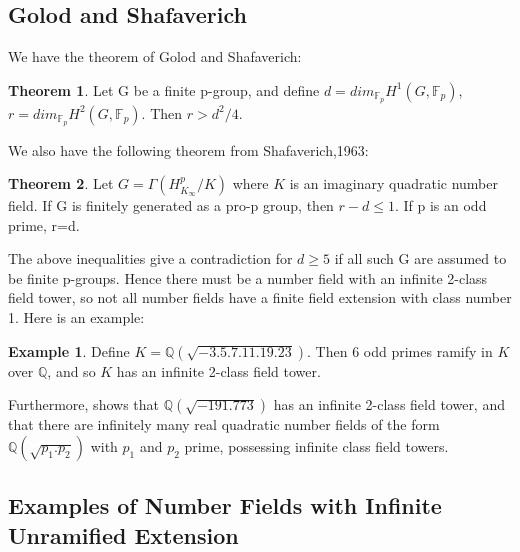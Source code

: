 \documentclass[12pt]{extarticle}
\newcommand{\<}{\langle}
\renewcommand{\>}{\rangle}
\theoremstyle{definition}
\newtheorem{theorem}{Theorem}
\newtheorem*{example}{Example}
\begin{document}
\subsection{Golod and Shafaverich}
We have the theorem of Golod and Shafaverich:\begin{theorem}
    Let G be a finite p-group, and define $d=dim_{\mathbb{F}_{p}}H^1(G,\mathbb{F}_p)$, $r=dim_{\mathbb{F}_{p}}H^2(G,\mathbb{F}_p)$. 
    Then $r>d^2/4$.
\end{theorem}
We also have the following theorem from Shafaverich,1963:\begin{theorem}
    Let $G = \Gamma(H_{K_{\infty}}^{p}/K)$ where $K$ is an imaginary quadratic number field. If G is finitely generated as a pro-p group, then
$r-d\leq 1 $. If p is an odd prime, r=d.
\end{theorem}
The above inequalities give a contradiction for $d \geq 5$ if all such G are assumed to be finite p-groups. Hence there must be a number field with an infinite 2-class field tower, so not all number fields have a finite field extension with class number 1. Here is an example:
\begin{example}
    Define $K=\mathbb{Q}(\sqrt{-3.5.7.11.19.23})$. Then 6 odd primes ramify in $K$ over $\mathbb{Q}$, and so $K$ has an infinite 2-class field tower. 
\end{example}
Furthermore, \cite{SCHO} shows that $\mathbb{Q}(\sqrt{-191.773})$ has an infinite 2-class field tower, and that there are infinitely many real quadratic number fields of the form $\mathbb{Q}(\sqrt{p_1.p_2})$ with $p_1$ and $p_2$ prime, possessing infinite class field towers. 

\subsection{Examples of Number Fields with Infinite Unramified Extension}
\end{document}
